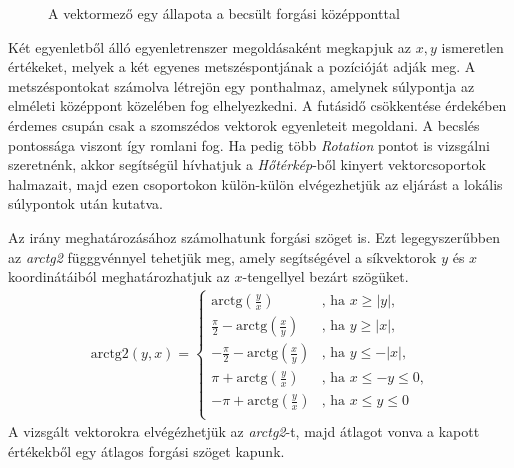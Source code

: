 \begin{figure}[h]
\centering
{}
\caption{A vektormező egy állapota a becsült forgási középponttal}
\label{fig:rotation}
\end{figure}

Két egyenletből álló egyenletrenszer megoldásaként megkapjuk az $x,y$ ismeretlen értékeket, melyek a két egyenes metszéspontjának a pozícióját adják meg.
A metszéspontokat számolva létrejön egy ponthalmaz, amelynek súlypontja az elméleti középpont közelében fog elhelyezkedni. A futásidő csökkentése érdekében érdemes csupán csak a szomszédos vektorok egyenleteit megoldani. A becslés pontossága viszont így romlani fog.
Ha pedig több \textit{Rotation} pontot is vizsgálni szeretnénk, akkor segítségül hívhatjuk a \textit{Hőtérkép}-ből kinyert vektorcsoportok halmazait, majd ezen csoportokon külön-külön elvégezhetjük az eljárást a lokális súlypontok után kutatva.

Az irány meghatározásához számolhatunk forgási szöget is. Ezt legegyszerűbben az \textit{arctg2} függgvénnyel tehetjük meg, amely segítségével a síkvektorok $y$ és $x$ koordinátáiból meghatározhatjuk az $x$-tengellyel bezárt szögüket.
\begin{align*}
		\text{arctg2$(y,x)$} =
  			\begin{cases}
    			\text{arctg$\left(\frac{y}{x}\right)$} & \text{, ha $x\geq \vert y \vert$,} \\
    			\frac{\pi}{2}-\text{arctg$\left(\frac{x}{y}\right)$} & \text{, ha $y\geq \vert x \vert$,}\\
    			-\frac{\pi}{2}-\text{arctg$\left(\frac{x}{y}\right)$} & \text{, ha $y\leq -\vert x \vert$,}\\
    			\pi+\text{arctg$\left(\frac{y}{x}\right)$} & \text{, ha $x \leq -y \leq 0$,}\\
    			-\pi+\text{arctg$\left(\frac{y}{x}\right)$} & \text{, ha $x \leq y \leq 0$}\\
  			\end{cases}
\end{align*}
A vizsgált vektorokra elvégézhetjük az \textit{arctg2}-t, majd átlagot vonva a kapott értékekből egy átlagos forgási szöget kapunk.

